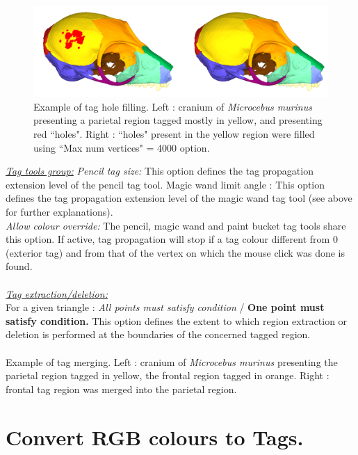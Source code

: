 \begin{figure}
  \centering
  \includegraphics[scale=0.25]{images/Tags/Fill_holes2.png} 
	\caption{Example of tag hole filling. Left : cranium of \textit{Microcebus murinus} presenting a parietal region tagged mostly in yellow, and presenting red ``holes". Right : ``holes" present in the yellow region were filled using ``Max num vertices" = 4000 option.
}
\label{tag_fill_holes_example}
 \end{figure}
\noindent
\textit{\underline{Tag tools group:}}
\textit{Pencil tag size:} This option defines the tag propagation extension
level of the pencil tag tool. Magic wand limit angle : This option defines the tag propagation extension level of the magic wand tag tool (see above for further explanations).\\
\textit{Allow colour override:} The pencil, magic wand and paint bucket tag tools share this option. If active, tag propagation will stop if a tag colour different from 0 (exterior tag) and from that of the vertex on which the mouse click was done is found.\\
\\
\noindent
\textit{\underline{Tag extraction/deletion:}}\\
For a given triangle : \textit{All points must satisfy condition} / \textbf{One point must satisfy condition.} This option defines the extent to which region extraction or deletion is performed at the boundaries of the concerned tagged region.\\\\
\noindent
Example of tag merging. Left : cranium of \textit{Microcebus murinus} presenting the parietal region
tagged in yellow, the frontal region tagged in orange. Right : frontal tag region was merged into the parietal region.


\section{Convert RGB colours to Tags.}

